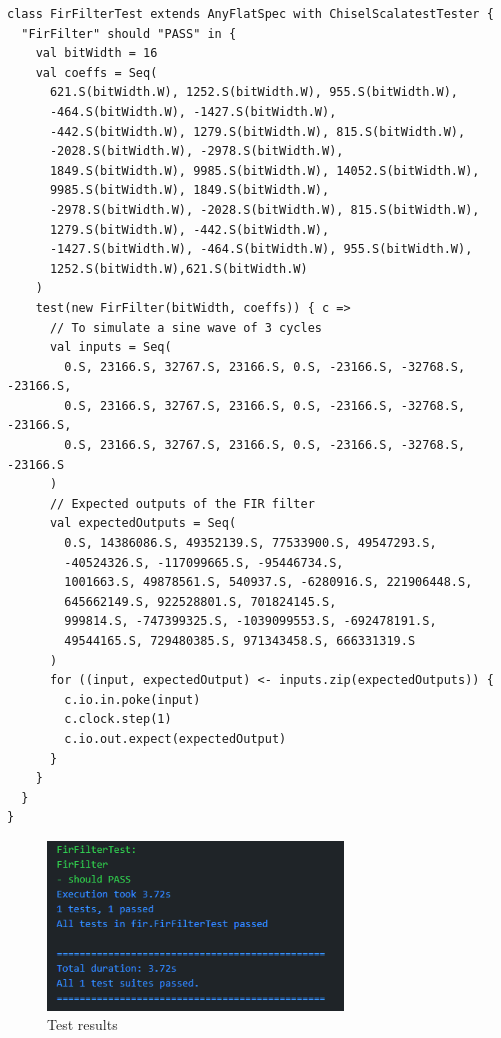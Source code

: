 \documentclass[a4paper,12pt]{article}
\begin{document}
\begin{lstlisting}[caption={Testbench},captionpos=b,label={lst:testbench}]
class FirFilterTest extends AnyFlatSpec with ChiselScalatestTester {
  "FirFilter" should "PASS" in {
    val bitWidth = 16
    val coeffs = Seq(
      621.S(bitWidth.W), 1252.S(bitWidth.W), 955.S(bitWidth.W),
      -464.S(bitWidth.W), -1427.S(bitWidth.W),
      -442.S(bitWidth.W), 1279.S(bitWidth.W), 815.S(bitWidth.W),
      -2028.S(bitWidth.W), -2978.S(bitWidth.W),
      1849.S(bitWidth.W), 9985.S(bitWidth.W), 14052.S(bitWidth.W),
      9985.S(bitWidth.W), 1849.S(bitWidth.W),
      -2978.S(bitWidth.W), -2028.S(bitWidth.W), 815.S(bitWidth.W),
      1279.S(bitWidth.W), -442.S(bitWidth.W),
      -1427.S(bitWidth.W), -464.S(bitWidth.W), 955.S(bitWidth.W),
      1252.S(bitWidth.W),621.S(bitWidth.W)
    )
    test(new FirFilter(bitWidth, coeffs)) { c =>
      // To simulate a sine wave of 3 cycles
      val inputs = Seq(
        0.S, 23166.S, 32767.S, 23166.S, 0.S, -23166.S, -32768.S, -23166.S,
        0.S, 23166.S, 32767.S, 23166.S, 0.S, -23166.S, -32768.S, -23166.S,
        0.S, 23166.S, 32767.S, 23166.S, 0.S, -23166.S, -32768.S, -23166.S
      )
      // Expected outputs of the FIR filter
      val expectedOutputs = Seq(
        0.S, 14386086.S, 49352139.S, 77533900.S, 49547293.S,
        -40524326.S, -117099665.S, -95446734.S,
        1001663.S, 49878561.S, 540937.S, -6280916.S, 221906448.S,
        645662149.S, 922528801.S, 701824145.S,
        999814.S, -747399325.S, -1039099553.S, -692478191.S,
        49544165.S, 729480385.S, 971343458.S, 666331319.S
      )
      for ((input, expectedOutput) <- inputs.zip(expectedOutputs)) {
        c.io.in.poke(input)
        c.clock.step(1)
        c.io.out.expect(expectedOutput)
      }
    }
  }
}
\end{lstlisting}


\begin{figure}[ht]
    \centering
    \includegraphics[width=0.7\textwidth]{images/testbench.png}
    \caption{Test results}
    \label{fig:testbench}
\end{figure}
\end{document}
